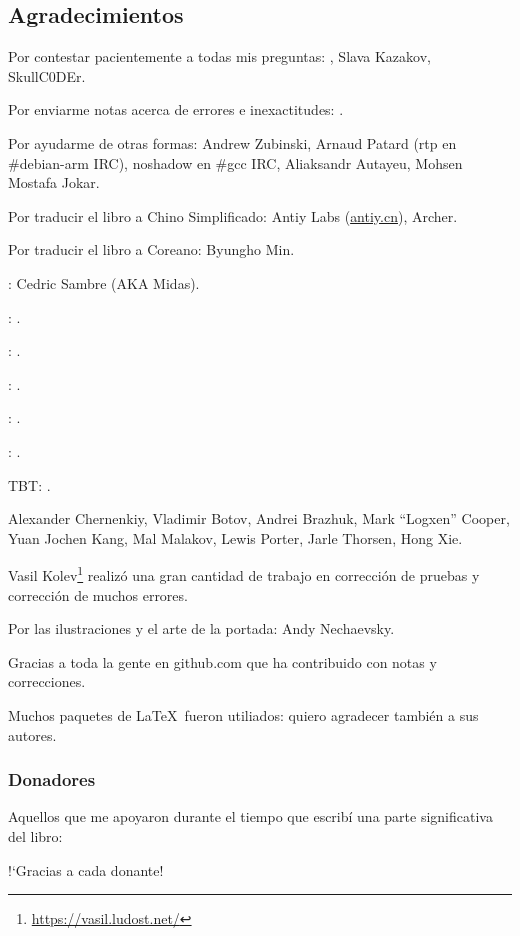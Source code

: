 \subsection*{Agradecimientos}

Por contestar pacientemente a todas mis preguntas: \HERMIT, Slava  Kazakov, SkullC0DEr.

Por enviarme notas acerca de errores e inexactitudes: \PeopleMistakesInaccuracies{}.

Por ayudarme de otras formas:
Andrew Zubinski,
Arnaud Patard (rtp en \#debian-arm IRC),
noshadow en \#gcc IRC,
Aliaksandr Autayeu,
Mohsen Mostafa Jokar.

Por traducir el libro a Chino Simplificado:
Antiy Labs (\href{http://antiy.cn}{antiy.cn}), Archer.

Por traducir el libro a Coreano: Byungho Min.

\ESph{}: Cedric Sambre (AKA Midas).

\ESph{}: \PeopleSpanishTranslators{}.

\ESph{}: \PeoplePTBRTranslators{}.

\ESph{}: \PeopleItalianTranslators{}.

\ESph{}: \PeopleFrenchTranslators{}.

\DEph{}: \PeopleGermanTranslators{}.

\ac{TBT}: \PeoplePolishTranslators{}.


%
Alexander  Chernenkiy,
Vladimir Botov,
Andrei Brazhuk,
Mark ``Logxen'' Cooper, Yuan Jochen Kang, Mal Malakov, Lewis Porter, Jarle Thorsen, Hong Xie.

Vasil Kolev\footnote{\url{https://vasil.ludost.net/}} realiz\'o una gran cantidad de trabajo en correcci\'on de pruebas y correcci\'on de muchos errores.

Por las ilustraciones y el arte de la portada: Andy Nechaevsky.

Gracias a toda la gente en github.com que ha contribuido con notas y correcciones\FNGithubContributors{}.

Muchos paquetes de \LaTeX\ fueron utiliados: quiero agradecer tambi\'en a sus autores.

\subsubsection*{Donadores}

Aquellos que me apoyaron durante el tiempo que escrib\'i una parte significativa del libro:



!`Gracias a cada donante!

